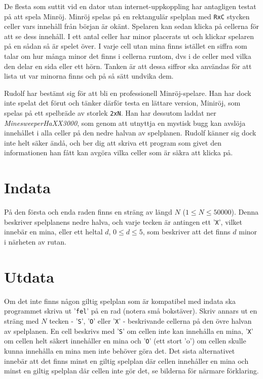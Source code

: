 De flesta som suttit vid en dator utan internet-uppkoppling har antagligen testat på att spela Minröj. Minröj spelas på en rektangulär spelplan med \texttt{RxC} stycken celler vars innehåll från början är okänt. Spelaren kan sedan klicka på cellerna för att se dess innehåll. I ett antal celler har minor placerats ut och klickar spelaren på en sådan så är spelet över. I varje cell utan mina finns istället en siffra som talar om hur många minor det finns i cellerna runtom, dvs i de celler med vilka den delar en sida eller ett hörn. Tanken är att dessa siffror ska användas för att lista ut var minorna finns och på så sätt undvika dem.

Rudolf har bestämt sig för att bli en professionell Minröj-spelare. Han har dock inte spelat det förut och tänker därför testa en lättare version, Miniröj, som spelas på ett spelbräde av storlek \texttt{2xN}. Han har dessutom laddat ner \emph{MinesweeperHaXX3000}, som genom att utnyttja en mystisk bugg kan avslöja innehållet i alla celler på den nedre halvan av spelplanen. Rudolf känner sig dock inte helt säker ändå, och ber dig att skriva ett program som givet den informationen han fått kan avgöra vilka celler som är säkra att klicka på.

\section*{Indata}
På den första och enda raden finns en sträng av längd $N$ ($1 \leq N \leq 50000$). Denna beskriver spelplanens nedre halva, och varje tecken är antingen ett '\texttt{X}', vilket innebär en mina, eller ett heltal $d$, $0 \leq d \leq 5$, som beskriver att det finns $d$ minor i närheten av rutan.

\section*{Utdata}
Om det inte finns någon giltig spelplan som är kompatibel med indata ska programmet skriva ut '\texttt{fel}' på en rad (notera små bokstäver). Skriv annars ut en sträng med $N$ tecken - '\texttt{S}', '\texttt{O}' eller '\texttt{X}' - beskrivande cellerna på den övre halvan av spelplanen. En cell beskrivs med '\texttt{S}' om cellen inte kan innehålla en mina, '\texttt{X}' om cellen helt säkert innehåller en mina och '\texttt{O}' (ett stort 'o') om cellen skulle kunna innehålla en mina men inte behöver göra det. Det sista alternativet innebär att det finns minst en giltig spelplan där cellen innehåller en mina och minst en giltig spelplan där cellen inte gör det, se bilderna för närmare förklaring.


